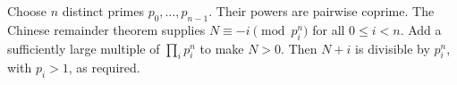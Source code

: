 Choose $n$ distinct primes $p_0,\ldots,p_{n-1}$. Their powers are pairwise coprime. The Chinese remainder theorem supplies $N\equiv-i\pmod{p_i^n}$ for all $0\le i<n$. Add a sufficiently large multiple of $\prod_i p_i^n$ to make $N>0$. Then $N+i$ is divisible by $p_i^n$, with $p_i>1$, as required.
